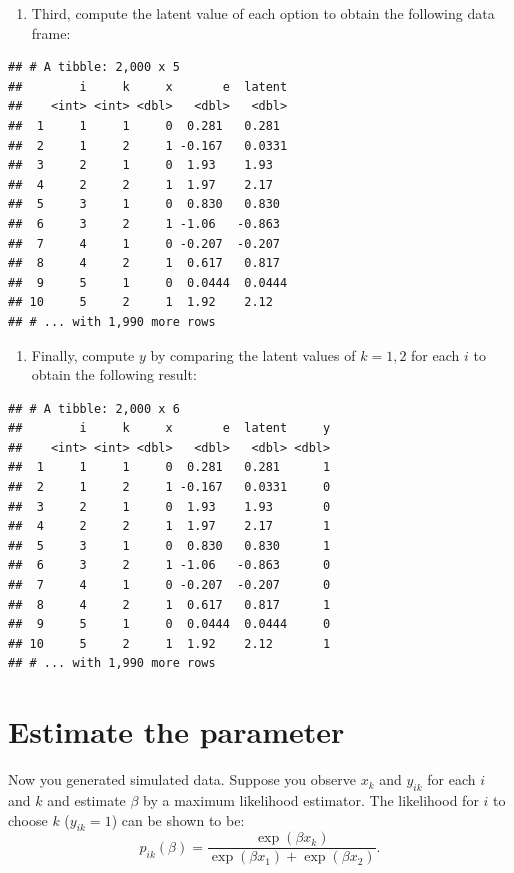 \documentclass[]{book}
\providecommand{\tightlist}{%
  \setlength{\itemsep}{0pt}\setlength{\parskip}{0pt}}
\begin{document}
\begin{enumerate}
\def\labelenumi{\arabic{enumi}.}
\setcounter{enumi}{2}
\tightlist
\item
  Third, compute the latent value of each option to obtain the following
  data frame:
\end{enumerate}

\begin{verbatim}
## # A tibble: 2,000 x 5
##        i     k     x       e  latent
##    <int> <int> <dbl>   <dbl>   <dbl>
##  1     1     1     0  0.281   0.281 
##  2     1     2     1 -0.167   0.0331
##  3     2     1     0  1.93    1.93  
##  4     2     2     1  1.97    2.17  
##  5     3     1     0  0.830   0.830 
##  6     3     2     1 -1.06   -0.863 
##  7     4     1     0 -0.207  -0.207 
##  8     4     2     1  0.617   0.817 
##  9     5     1     0  0.0444  0.0444
## 10     5     2     1  1.92    2.12  
## # ... with 1,990 more rows
\end{verbatim}

\begin{enumerate}
\def\labelenumi{\arabic{enumi}.}
\setcounter{enumi}{3}
\tightlist
\item
  Finally, compute \(y\) by comparing the latent values of \(k = 1, 2\)
  for each \(i\) to obtain the following result:
\end{enumerate}

\begin{verbatim}
## # A tibble: 2,000 x 6
##        i     k     x       e  latent     y
##    <int> <int> <dbl>   <dbl>   <dbl> <dbl>
##  1     1     1     0  0.281   0.281      1
##  2     1     2     1 -0.167   0.0331     0
##  3     2     1     0  1.93    1.93       0
##  4     2     2     1  1.97    2.17       1
##  5     3     1     0  0.830   0.830      1
##  6     3     2     1 -1.06   -0.863      0
##  7     4     1     0 -0.207  -0.207      0
##  8     4     2     1  0.617   0.817      1
##  9     5     1     0  0.0444  0.0444     0
## 10     5     2     1  1.92    2.12       1
## # ... with 1,990 more rows
\end{verbatim}

\section{Estimate the parameter}\label{estimate-the-parameter}

Now you generated simulated data. Suppose you observe \(x_k\) and
\(y_{ik}\) for each \(i\) and \(k\) and estimate \(\beta\) by a maximum
likelihood estimator. The likelihood for \(i\) to choose \(k\)
(\(y_{ik} = 1\)) can be shown to be: \[
p_{ik}(\beta) = \frac{\exp(\beta x_k)}{\exp(\beta x_1) + \exp(\beta x_2)}.
\]
\end{document}
